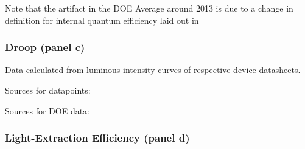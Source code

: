 \documentclass[10pt]{article}
\begin{document}
\cite{doe_ssl_multiyear_2006}\cite{doe_ssl_multiyear_2007}\cite{doe_ssl_multiyear_2008}\cite{doe_ssl_multiyear_2009}\cite{doe_ssl_multiyear_2010}\cite{doe_ssl_multiyear_2011}\cite{doe_ssl_multiyear_2012}\cite{doe_ssl_multiyear_2013}\cite{doe_ssl_multiyear_2014}\cite{doe_ssl_rnd_2015}\cite{doe_ssl_rnd_2016}

Note that the artifact in the DOE Average around 2013 is due to a change in definition for internal quantum efficiency laid out in \cite{doe_ssl_multiyear_2013}

\subsubsection{Droop (panel c)}

Data calculated from luminous intensity curves of respective device datasheets.

Sources for datapoints: \cite{datasheet_osram_topled}\cite{osram2008data}\cite{osram2008gdplus}\cite{osram2018csp}\cite{datasheet_lumileds_lux1}\cite{lumi2008data}\cite{lumi2016data_1}\cite{lumi2016data_2}\cite{samsung2018data}

Sources for DOE data: \cite{doe_ssl_multiyear_2010}\cite{doe_ssl_multiyear_2011}\cite{doe_ssl_multiyear_2012}\cite{doe_ssl_multiyear_2013}\cite{doe_ssl_multiyear_2014}\cite{doe_ssl_rnd_2015}\cite{doe_ssl_rnd_2016}

\subsubsection{Light-Extraction Efficiency (panel d)}

\cite{lee2005analysis}\cite{krames2007status}\cite{Jang2004}\cite{Horng2013}\cite{Liao2010}\cite{HungWenHuang2005}\cite{Leem2007}\cite{Huang2008}\cite{Wang2009}\cite{Huh2003}\cite{Horng2008}\cite{Gao2008}\cite{Chang2003}\cite{Zhou2012}\cite{ChunJuTun2006}\cite{Hua2009}\cite{Matioli2010} \newline
\cite{lee2005analysis}\cite{Zhu2015}\cite{Ding2015}\cite{Taki2019}\cite{Shchekin2006}\cite{Hu2016}\cite{Horng2010}\cite{Lin2016}\cite{Yue2018}\cite{Zhao2012}\cite{Zhu2015}\cite{Ding2015}\cite{wierer2001high}\cite{Steigerwald2002}\cite{DaeSeobHan2006}\cite{Wang2006}\cite{Lee2007}\cite{Shen2007}\cite{Huang2006}\cite{Zhmakin2011}

\newpage


\end{document}
